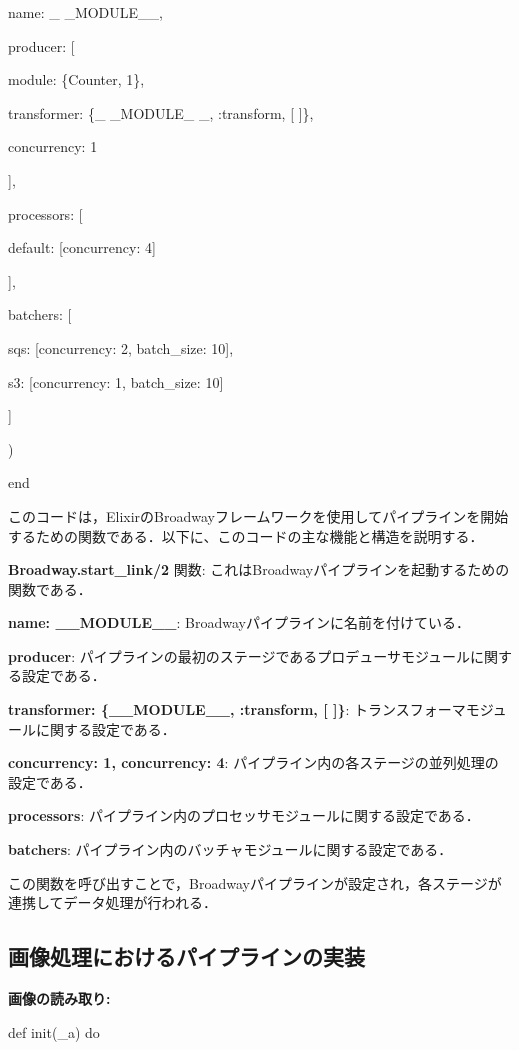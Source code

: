 \documentclass[a4paper]{jreport}	%
\begin{document}
      name: \_ \_MODULE\_\_,
      
      producer: [
      
        module: \{Counter, 1\},
        
        transformer: \{\_ \_MODULE\_ \_, :transform, [ ]\},
        
        concurrency: 1
        
       ],
       
      processors: [
      
        default: [concurrency: 4]
        
      ],
      
        batchers: [
        
        sqs: [concurrency: 2, batch\_size: 10],
        
        s3: [concurrency: 1, batch\_size: 10]
        
      ]
      
    )
    
end

このコードは，ElixirのBroadwayフレームワークを使用してパイプラインを開始するための関数である．以下に、このコードの主な機能と構造を説明する．

\textbf{Broadway.start\_link/2 }関数: これはBroadwayパイプラインを起動するための関数である．

\textbf{name: \_\_MODULE\_\_}: Broadwayパイプラインに名前を付けている．

\textbf{producer}: パイプラインの最初のステージであるプロデューサモジュールに関する設定である．

\textbf{transformer: \{\_\_MODULE\_\_, :transform, [ ]\}}: トランスフォーマモジュールに関する設定である．

\textbf{concurrency: 1, concurrency: 4}: パイプライン内の各ステージの並列処理の設定である．

\textbf{processors}: パイプライン内のプロセッサモジュールに関する設定である．

\textbf{batchers}: パイプライン内のバッチャモジュールに関する設定である．

この関数を呼び出すことで，Broadwayパイプラインが設定され，各ステージが連携してデータ処理が行われる．
\subsection{画像処理におけるパイプラインの実装}

\textbf{画像の読み取り:}

def init(\_a) do
\end{document}
